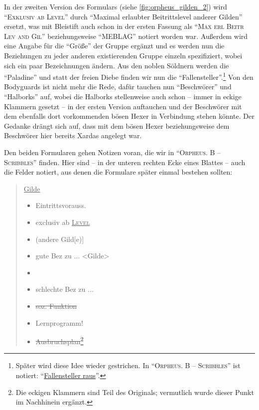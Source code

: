 \documentclass[a5paper,pagesize,numbers=noenddot]{scrbook}
\begin{document}
In der zweiten Version des Formulars (siehe \autoref{fig:orpheus_gilden_2}) wird \enquote{\textsc{Exklusiv ab Level}} durch \enquote{Maximal erlaubter Beitrittslevel anderer Gilden} ersetzt, was mit Bleistift auch schon in der ersten Fassung als \enquote{\textsc{Max erl Beitr Lev and Gil}} beziehungsweise \enquote{MEBLAG} notiert worden war.\autocite[S.~1\,f.]{orpheus_gildensystem}
Außerdem wird eine Angabe für die \enquote{Größe} der Gruppe ergänzt und es werden nun die Beziehungen zu jeder anderen existierenden Gruppe einzeln spezifiziert, wobei sich ein paar Bezeichnungen ändern.
Aus den noblen Söldnern werden die \enquote{Paladine} und statt der freien Diebe finden wir nun die \enquote{Fallensteller}.\footnote{Später wird diese Idee wieder gestrichen. In \enquote{\textsc{Orpheus. B -- Scribbles}} ist notiert: \enquote{\uline{Fallensteller raus}}.}
Von den Bodyguards ist nicht mehr die Rede, dafür tauchen nun \enquote{Beschwörer} und \enquote{Halborks} auf, wobei die Halborks stellenweise auch schon -- immer in eckige Klammern gesetzt -- in der ersten Version auftauchen und der Beschwörer mit dem ebenfalls dort vorkommenden bösen Hexer in Verbindung stehen könnte.
Der Gedanke drängt sich auf, dass mit dem bösen Hexer beziehungsweise dem Beschwörer hier bereits Xardas angelegt war.

Den beiden Formularen gehen Notizen voran, die wir in \enquote{\textsc{Orpheus. B -- Scribbles}} finden.\autocite[Vgl.][S.~13--15]{orpheus_b_scribbles}
Hier sind -- in der unteren rechten Ecke eines Blattes -- auch die Felder notiert, aus denen die Formulare später einmal bestehen sollten:

\begin{quote}
   \uline{Gilde}
   \begin{itemize}
      \item[--] Eintrittsvorauss.
      \item[--] exclusiv ab \textsc{\uline{Level}}
      \item[] \phantom{exclusiv ab} (andere Gild[e)]
      \item[--] gute Bez zu $\ldots$ <Gilde>
      \item[] [neutrale zu $\ldots$]
      \item[--] schlechte Bez zu $\ldots$
      \item[--] \sout{soz. Funktion}
      \item[--] Lernprogramm!
      \item[--] \sout{Ausbruchsplan}\footnote{Die eckigen Klammern sind Teil des Originals; vermutlich wurde dieser Punkt im Nachhinein ergänzt.}
   \end{itemize}
\end{quote}
\end{document}
